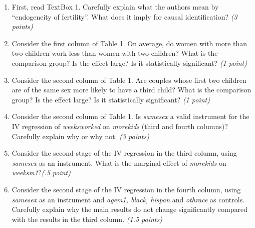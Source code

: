 \documentclass{article}
\begin{document}
\begin{enumerate}[label=\alph*)]

\item First, read TextBox 1. Carefully explain what the authors mean by ``endogeneity of fertility''. What does it imply for causal identification? \textit{(3 points)}
\item Consider the first column of Table 1. On average, do women with more than two children work less than women with two children? What is the comparison group? Is the effect large? Is it statistically significant?  \textit{(1 point)}
\item Consider the second column of Table 1. Are couples whose first two children are of the same sex more likely to have a third child? What is the comparison group? Is the effect large? Is it statistically significant? \textit{(1 point)}
\item  Consider the second column of Table 1. Is \textit{samesex} a valid instrument for the IV regression of \textit{weeksworked} on \textit{morekids} (third and fourth columns)? Carefully explain why or why not. \textit{(3 points)}
\item Consider the second stage of the IV regression in the third column, using \textit{samesex} as an instrument. What is the marginal effect of \textit{morekids} on \textit{weeksm1}?\textit{(.5 point)}
\item  Consider the second stage of the IV regression in the fourth column, using \textit{samesex} as an instrument and \textit{agem1, black, hispan} and \textit{othrace} as controls. Carefully explain why the main results do not change significantly compared with the results in the third column. \textit{(1.5 points)}
\end{enumerate}
\end{document}
